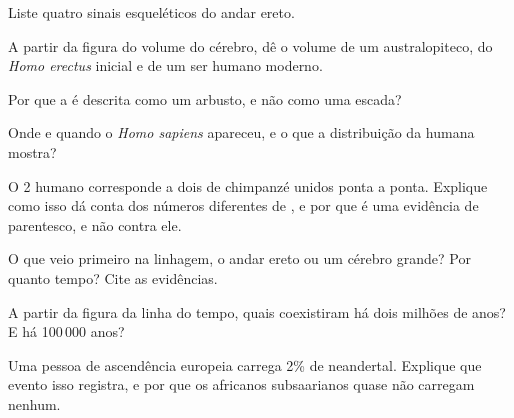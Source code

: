\begin{exercise}[$\star$]\label{exo:g12:human-evolution:2}
Liste quatro sinais esqueléticos do andar ereto.
\end{exercise}

\begin{exercise}[$\star$]\label{exo:g12:human-evolution:3}
A partir da figura do volume do cérebro, dê o volume de um
australopiteco, do \emph{Homo erectus} inicial e de um ser humano moderno.
\end{exercise}

\begin{exercise}[$\star$]\label{exo:g12:human-evolution:4}
Por que a  é descrita como um arbusto, e não como uma escada?
\end{exercise}

\begin{exercise}[$\star$]\label{exo:g12:human-evolution:5}
Onde e quando o \emph{Homo sapiens} apareceu, e o que a distribuição da
 humana mostra?
\end{exercise}

\begin{exercise}[$\star\star$]\label{exo:g12:human-evolution:6}
O  2 humano corresponde a dois  de chimpanzé
unidos ponta a ponta. Explique como isso dá conta dos números
diferentes de , e por que é uma evidência de parentesco, e
não contra ele.
\end{exercise}

\begin{exercise}[$\star\star$]\label{exo:g12:human-evolution:7}
O que veio primeiro na linhagem, o andar ereto ou um cérebro grande?
Por quanto tempo? Cite as evidências.
\end{exercise}

\begin{exercise}[$\star\star$]\label{exo:g12:human-evolution:8}
A partir da figura da linha do tempo, quais  coexistiram há
dois milhões de anos? E há 100\,000 anos?
\end{exercise}

\begin{exercise}[$\star\star$]\label{exo:g12:human-evolution:9}
Uma pessoa de ascendência europeia carrega 2\% de  neandertal.
Explique que evento isso registra, e por que os africanos subsaarianos
quase não carregam nenhum.
\end{exercise}

